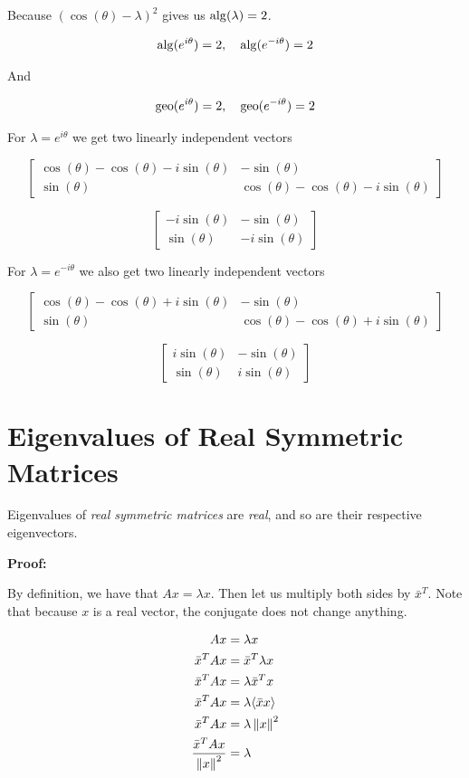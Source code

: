 Because \((\cos(\theta) - \lambda)^2\) gives us \(\mathrm{alg}(\lambda) = 2\).

\[
    \mathrm{alg}(e^{i\theta}) =  2, \quad \mathrm{alg}(e^{-i\theta}) = 2
\]

And 

\[
    \mathrm{geo}(e^{i\theta}) = 2, \quad \mathrm{geo}(e^{-i\theta}) = 2
\]

For \(\lambda = e^{i\theta}\) we get two linearly independent vectors

\[
    \begin{bmatrix}
        \cos(\theta) - \cos(\theta) - i\sin(\theta) & -\sin(\theta) \\
        \sin(\theta) & \cos(\theta) - \cos(\theta) - i\sin(\theta)
    \end{bmatrix}
\]

\[
    \begin{bmatrix}
        - i\sin(\theta) & -\sin(\theta) \\ 
        \sin(\theta) &    -i\sin(\theta)
    \end{bmatrix}
\]

For \(\lambda = e^{-i\theta}\) we also get two linearly independent vectors

\[
    \begin{bmatrix}
        \cos(\theta) - \cos(\theta) +i\sin(\theta) & -\sin(\theta) \\
        \sin(\theta) & \cos(\theta) - \cos(\theta) +i\sin(\theta)
    \end{bmatrix}
\]

\[
    \begin{bmatrix}
        i\sin(\theta) & -\sin(\theta) \\ 
        \sin(\theta) &    i\sin(\theta)
    \end{bmatrix}
\]

\section{Eigenvalues of Real Symmetric Matrices}

Eigenvalues of \emph{real symmetric matrices} are \emph{real}, and so are their respective eigenvectors.

\textbf{Proof:}

By definition, we have that \(Ax = \lambda x\). Then let us multiply both sides by \( \bar{x}^T\). Note 
that because \(x\) is a real vector, the conjugate does not change anything.

\begin{align*}
    Ax &= \lambda x \\
    \bar{x}^T A x &= \bar{x}^T \lambda x \\
    \bar{x}^T A x &= \lambda \bar{x}^T x \\
    \bar{x}^T A x &= \lambda \langle \bar{x} x \rangle\\
    \bar{x}^T A x &= \lambda \left\| x \right\|^2\\
    \frac{\bar{x}^T A x}{\left\| x \right\|^2} &= \lambda
\end{align*}


